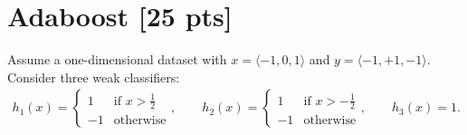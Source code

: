 \documentclass[11pt]{article}
\renewcommand{\vec}[1]{\mathbf{#1}}
\begin{document}


 


\pagebreak
\section{Adaboost [25 pts]}
Assume a one-dimensional dataset with $x = \langle -1, 0, 1 \rangle$ and $y =
\langle -1, +1, -1 \rangle$.  Consider three weak classifiers:
\begin{align*}
  h_1(x) = \begin{cases}
    1  & \text{if } x > \frac{1}{2} \\
    -1 & \text{otherwise}
  \end{cases},
  \quad\quad
  h_2(x) = \begin{cases}
    1  & \text{if } x > - \frac{1}{2} \\
    -1 & \text{otherwise}
  \end{cases},
  \quad\quad
  h_3(x) = 1.
\end{align*}
\end{document}
